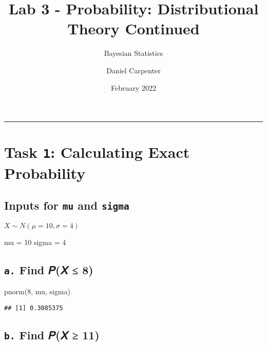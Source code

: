 \documentclass[
  12pt,
]{article}
\title{Lab 3 - Probability: Distributional Theory Continued}
\subtitle{Bayesian Statistics}
\author{Daniel Carpenter}
\date{February 2022}
\newenvironment{Shaded}{\begin{snugshade}}{\end{snugshade}}
\newcommand{\DecValTok}[1]{\textcolor[rgb]{0.00,0.00,0.81}{#1}}
\newcommand{\FunctionTok}[1]{\textcolor[rgb]{0.00,0.00,0.00}{#1}}
\newcommand{\NormalTok}[1]{#1}
\newcommand{\OtherTok}[1]{\textcolor[rgb]{0.56,0.35,0.01}{#1}}
\begin{document}
\maketitle

{
\setcounter{tocdepth}{2}
\tableofcontents
}
\begin{center}\rule{0.5\linewidth}{0.5pt}\end{center}

\hypertarget{task-1-calculating-exact-probability}{%
\section{\texorpdfstring{Task \texttt{1}: Calculating Exact
Probability}{Task 1: Calculating Exact Probability}}\label{task-1-calculating-exact-probability}}

\hypertarget{inputs-for-mu-and-sigma}{%
\subsection{\texorpdfstring{Inputs for \texttt{mu} and
\texttt{sigma}}{Inputs for mu and sigma}}\label{inputs-for-mu-and-sigma}}

\(X \sim N(\mu = 10, \sigma = 4)\)

\begin{Shaded}
\begin{Highlighting}[]
\NormalTok{mu    }\OtherTok{=} \DecValTok{10}
\NormalTok{sigma }\OtherTok{=} \DecValTok{4}
\end{Highlighting}
\end{Shaded}

\hypertarget{a.-find-ux1d443ux1d44b-8}{%
\subsection{\texorpdfstring{\texttt{a.} Find 𝑃(𝑋 ≤
8)}{a. Find 𝑃(𝑋 ≤ 8)}}\label{a.-find-ux1d443ux1d44b-8}}

\begin{Shaded}
\begin{Highlighting}[]
\FunctionTok{pnorm}\NormalTok{(}\DecValTok{8}\NormalTok{, mu, sigma)}
\end{Highlighting}
\end{Shaded}

\begin{verbatim}
## [1] 0.3085375
\end{verbatim}

\hypertarget{b.-find-ux1d443ux1d44b-11}{%
\subsection{\texorpdfstring{\texttt{b.} Find 𝑃(𝑋 ≥
11)}{b. Find 𝑃(𝑋 ≥ 11)}}\label{b.-find-ux1d443ux1d44b-11}}
\end{document}
